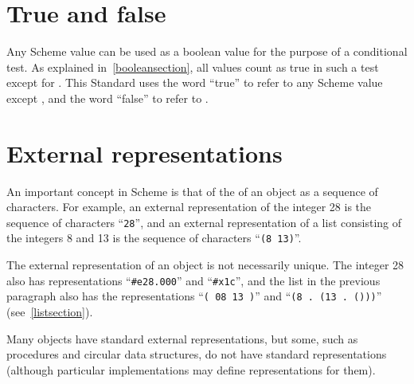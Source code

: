 



\section{True and false}

\vest Any Scheme value can be used as a boolean value for the purpose
of a conditional test.  As explained in~\ref{booleansection}, all
values count as true in such a test except for \schfalse{}.  This
Standard uses the word ``true'' to refer to any Scheme value except
\schfalse{}, and the word ``false'' to refer to \schfalse{}.
 



\section{External representations}
\label{externalreps}

An important concept in Scheme is that of the  of an object as a sequence of characters.  For
example, an external representation of the integer 28 is the sequence
of characters ``{\tt 28}'', and an external representation of a list
consisting of the integers 8 and 13 is the sequence of characters
``{\tt(8 13)}''.

\vest The external representation of an object is not necessarily
unique.  The integer 28 also has representations ``{\tt \#e28.000}''
and ``{\tt\#x1c}'', and the list in the previous paragraph also has
the representations ``{\tt( 08 13 )}'' and ``{\tt(8 .\ (13 .\ ()))}''
(see~\ref{listsection}).

\vest Many objects have standard external representations, but some,
such as procedures and circular data structures, do not have standard
representations (although particular implementations may define
representations for them).

